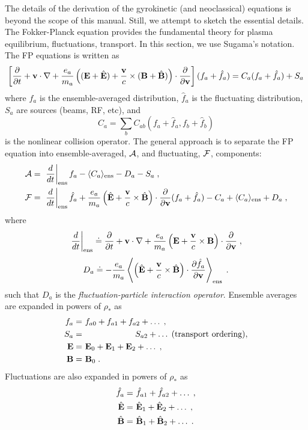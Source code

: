 The details of the derivation of the gyrokinetic (and neoclassical) 
equations is beyond the scope of this manual.  Still, we attempt to 
sketch the essential details. The Fokker-Planck equation provides the 
fundamental theory for plasma equilibrium, fluctuations, transport.
In this section, we use Sugama's notation.  The FP equations is written as
%
\begin{align}
\left[ \frac{\partial}{\partial t} + {\bf v}\cdot\nabla + 
\frac{e_a}{m_a} \left( ({\bf E}+{\hat {\bf E}}) + \frac{\bf v}{c} \times 
(\mathbf{B}+{\hat {\bf B}}) \right) \cdot \frac{\partial}{\partial{\bf v}} \right] 
(f_a+{\hat f}_a)
= C_a(f_a+{\hat f}_a) + S_a
\end{align}
%
where $f_a$ is the ensemble-averaged distribution, ${\hat f}_a$ is the 
fluctuating distribution, $S_a$ are sources (beams, RF, etc), and
%
\begin{equation}
C_a = \sum_b C_{ab}(f_a+{\hat f}_a,f_b+{\hat f}_b) 
\end{equation}
%
is the nonlinear collision operator.  The general approach is to separate 
the FP equation into ensemble-averaged, ${\cal A}$, and fluctuating, 
${\cal F}$, components:
%
\begin{align}
{\cal A} = &~\left. \frac{d}{dt} \right|_{\rm ens} f_a 
 - \langle C_a \rangle_{\rm ens} - D_a - S_a \; , \\ 
{\cal F} = &~\left. \frac{d}{dt} \right|_{\rm ens} {\hat f}_a 
 +\frac{e_a}{m_a} \left( {\hat {\bf E}} + \frac{\bf v}{c} \times {\hat {\bf B}} \right) 
 \cdot \frac{\partial}{\partial{\bf v}} ( f_a + {\hat f}_a )
 - C_a + \langle C_a \rangle_{\rm ens} + D_a \; ,
\end{align}
%
where 
%
\begin{equation}
\left. \frac{d}{dt} \right|_{\rm ens} \doteq 
 \frac{\partial}{\partial t} + {\bf v}\cdot\nabla 
+ \frac{e_a}{m_a} \left( {\bf E} + \frac{\bf v}{c} \times \mathbf{B} \right) 
 \cdot \frac{\partial}{\partial{\bf v}} \; ,
\end{equation}
%
\begin{equation}
D_a \doteq - \frac{e_a}{m_a} \left<
 \left( {\hat {\bf E}} + \frac{\bf v}{c} \times {\hat {\bf B}} \right) \cdot 
 \frac{\partial{\hat f}_a }{\partial{\bf v}} \right>_{\rm ens} \; .
\end{equation}
%
such that $D_a$ is the {\it fluctuation-particle interaction operator}.
Ensemble averages are expanded in powers of $\rho_*$ as
%
\begin{align}
f_a = &~f_{a0} + f_{a1} + f_{a2} + \ldots \; , \\ 
S_a = &~\qquad\qquad\qquad S_{a2} + \ldots \; \mbox{(transport ordering)}, \\
{\bf E} = &~{\bf E}_0 + {\bf E}_1 + {\bf E}_2 + \ldots \; , \\ 
\mathbf{B} = &~\mathbf{B}_0 \; .
\end{align}
%
Fluctuations are also expanded in powers of $\rho_*$ as
%
\begin{align}
{\hat f}_a = &~{\hat f}_{a1} + {\hat f}_{a2} + \ldots \; , \\
{\hat {\bf E}} = &~{\hat {\bf E}}_1 +  {\hat {\bf E}}_2 + \ldots \; , \\
{\hat {\bf B}} = &~{\hat {\bf B}}_1 + {\hat {\bf B}}_2 + \ldots \; .
\end{align}
%
